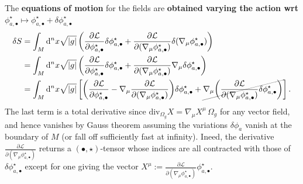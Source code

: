 \documentclass[../geometry_main.tex]{subfiles}
\begin{document}
\begin{mytheorem}
The \textbf{equations of motion} for the fields are \textbf{obtained varying the action wrt} $\phi^\star_{a,\bullet}\mapsto \phi_{a,\bullet}^\star + \delta \phi_{a,\bullet}^\star$ 
{\small
\begin{align}
    \delta S &= \int_M \mathrm{d}^n x \sqrt{|g|} \left( \frac{\partial \mathcal{L}}{\partial \phi^\star_{a,\bullet}} \delta \phi^\star_{a,\bullet} + \frac{\partial \mathcal{L}}{\partial (\nabla_\mu \phi^\star_{a,\bullet})} \delta (\nabla_\mu \phi^\star_{a,\bullet}) \right)
    \\
    &= \int_M \mathrm{d}^n x \sqrt{|g|} \left( \frac{\partial \mathcal{L}}{\partial \phi^\star_{a,\bullet}} \delta \phi^\star_{a,\bullet} + \frac{\partial \mathcal{L}}{\partial (\nabla_\mu \phi^\star_{a,\bullet})} \nabla_\mu \delta \phi^\star_{a,\bullet} \right)
    \\
    &= \int_M \mathrm{d}^n x \sqrt{|g|} \left[ \bigg(\frac{\partial \mathcal{L}}{\partial \phi^\star_{a,\bullet}} -  \nabla_\mu \frac{\partial \mathcal{L}}{\partial (\nabla_\mu \phi^\star_{a,\bullet})}\bigg) \delta \phi^\star_{a,\bullet} +  \graycancel{\nabla_\mu \bigg( \frac{\partial \mathcal{L}}{\partial (\nabla_\mu \phi^\star_{a,\bullet})} \delta\phi^\star_{a,\bullet}\bigg)}\right].
\end{align}
}
The last term is a total derivative since $\text{div}_{\Omega_g}X=\nabla_\mu X^\mu\,\Omega_g$ for any vector field, and hence vanishes by Gauss theorem assuming the variations $\delta \phi_a$ vanish at the boundary of $M$ (or fall off sufficiently fast at infinity).
Ineed, the derivative $\frac{\partial \mathcal{L}}{\partial (\nabla_\mu \phi^\star_{a,\bullet})}$ returns a $(\bullet,\star)$-tensor whose indices are all contracted with those of $\delta \phi_{a,\bullet}^\star$ except for one giving the vector $X^\mu:=\frac{\partial \mathcal{L}}{\partial (\nabla_\mu \phi^\star_{a,\bullet})}\phi^\star_{a,\bullet}$. 
%


\end{mytheorem}
\end{document}
